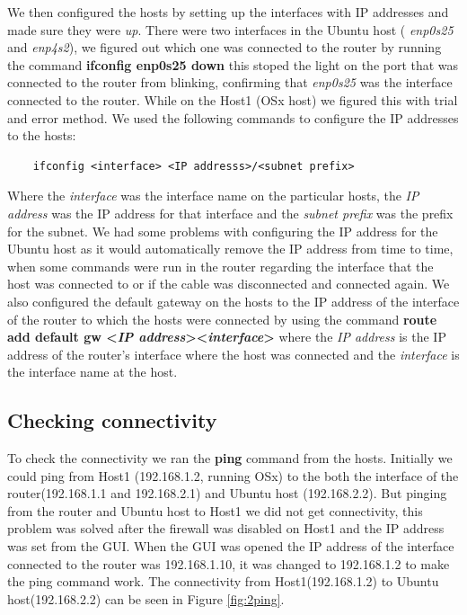 \documentclass{article}
\begin{document}
We then configured the hosts by setting up the interfaces with IP addresses and made sure they were \textit{up}. There were two interfaces in the Ubuntu host ( \textit{enp0s25} and \textit{enp4s2}), we figured out which one was connected to the router by running the command \textbf{ifconfig enp0s25 down} this stoped the light on the port that was connected to the router from blinking, confirming that \textit{enp0s25} was the interface connected to the router. While on the Host1 (OSx host) we figured this with trial and error method. We used the following commands to configure the IP addresses to the hosts:
\begin{verbatim}
    ifconfig <interface> <IP addresss>/<subnet prefix>
\end{verbatim}
Where the \textit{interface} was the interface name on the particular hosts, the \textit{IP address} was the IP address for that interface and the \textit{subnet prefix} was the prefix for the subnet. We had some problems with configuring the IP address for the Ubuntu host as it would automatically remove the IP address from time to time, when some commands were run in the router regarding the interface that the host was connected to or if the cable was disconnected and connected again. We also configured the default gateway on the hosts to the IP address of the interface of the router to which the hosts were connected by using the command \textbf{route add default gw \textless\textit{IP address}\textgreater \textless\textit{interface}\textgreater} where the \textit{IP address} is the IP address of the router's interface where the host was connected and the \textit{interface} is the interface name at the host. 

\subsection{Checking connectivity}

To check the connectivity we ran the \textbf{ping} command from the hosts. Initially we could ping from Host1 (192.168.1.2, running OSx) to the both the interface of the router(192.168.1.1 and 192.168.2.1) and Ubuntu host (192.168.2.2). But pinging from the router and Ubuntu host to Host1 we did not get connectivity, this problem was solved after the firewall was disabled on Host1 and the IP address was set from the GUI. When the GUI was opened the IP address of the interface connected to the router was 192.168.1.10, it was changed to 192.168.1.2 to make the ping command work. The connectivity from Host1(192.168.1.2) to Ubuntu host(192.168.2.2) can be seen in Figure \ref{fig:2ping}.
\end{document}
